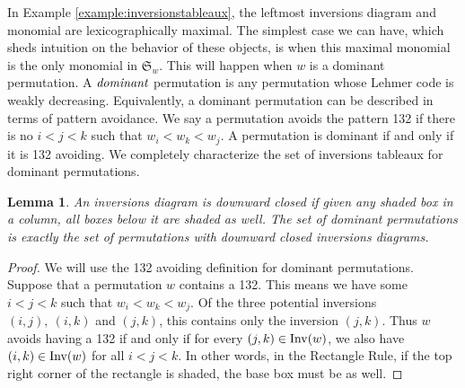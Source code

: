 \documentclass{article}
\newtheorem{lemma}[theorem]{Lemma}
\theoremstyle{definition}
\begin{document}
In Example \ref{example:inversionstableaux}, the leftmost inversions diagram and monomial are lexicographically maximal.
The simplest case we can have, which sheds intuition on the behavior of these objects, is when this maximal monomial is the only monomial in $\mathfrak{S}_w$. This will happen when $w$ is a dominant permutation. A $\emph{dominant}$ permutation is any permutation whose Lehmer code is weakly decreasing. Equivalently, a dominant permutation can be described in terms of pattern avoidance. We say a permutation avoids the pattern 132 if there is no $i<j<k$ such that $w_i < w_k < w_j$. A permutation is dominant if and only if it is 132 avoiding. We completely characterize the set of inversions tableaux for dominant permutations.
 

\begin{lemma}
\label{lemma:downward closed}
    An inversions diagram is \emph{downward closed} if given any shaded box in a column, all boxes below it are shaded as well. The set of dominant permutations is exactly the set of permutations with downward closed inversions diagrams.
\end{lemma}

\begin{proof}
    We will use the 132 avoiding definition for dominant permutations. Suppose that a permutation $w$ contains a 132. This means we have some $i < j < k$ such that $w_i < w_k < w_j$. Of the three potential inversions $(i,j), \ (i,k)$ and $(j,k)$, this contains only the inversion $(j,k)$. Thus $w$ avoids having a 132 if and only if for every $(j,k) \in \mathrm{Inv}(w)$, we also have $(i,k) \in \mathrm{Inv}(w)$ for all $i < j < k$. In other words, in the Rectangle Rule, if the top right corner of the rectangle is shaded, the base box must be as well.
\end{proof}
\end{document}
